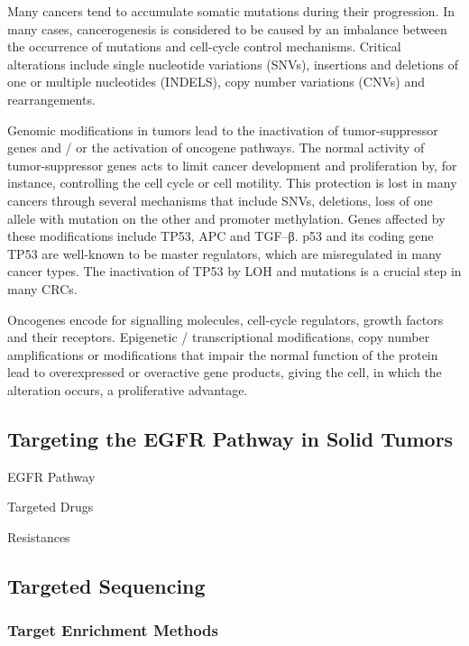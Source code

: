     Many cancers tend to accumulate somatic mutations during their progression.
    In many cases, cancerogenesis is considered to be caused by an imbalance
    between the occurrence of mutations and cell-cycle control mechanisms.
    Critical alterations include single nucleotide variations (SNVs), insertions
    and deletions of one or multiple nucleotides (INDELS), copy number
    variations (CNVs) and rearrangements.

    Genomic modifications in tumors lead to the inactivation of tumor-suppressor
    genes and / or the activation of oncogene pathways. The normal activity of
    tumor-suppressor genes acts to limit cancer development and proliferation
    by, for instance, controlling the cell cycle or cell motility. This
    protection is lost in many cancers through several mechanisms that include
    SNVs, deletions, loss of one allele with mutation on the other and promoter
    methylation. Genes affected by these modifications include TP53, APC and
    TGF--β. p53 and its coding gene TP53 are well-known to be master regulators,
    which are misregulated in many cancer types. The inactivation of TP53 by LOH
    and mutations is a crucial step in many CRCs.

    Oncogenes encode for signalling molecules, cell-cycle regulators, growth
    factors and their receptors. Epigenetic / transcriptional modifications,
    copy number amplifications or modifications that impair the normal function
    of the protein lead to overexpressed or overactive gene products, giving the
    cell, in which the alteration occurs, a proliferative advantage.

  \subsection{Targeting the EGFR Pathway in Solid Tumors}

    EGFR Pathway

    Targeted Drugs

    Resistances

  \subsection{Targeted Sequencing}

    \subsubsection{Target Enrichment Methods}

